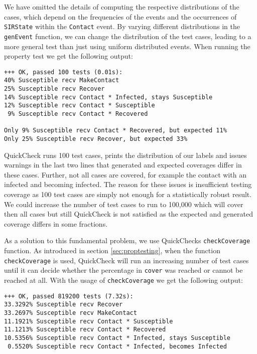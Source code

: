 We have omitted the details of computing the respective distributions of the cases, which depend on the frequencies of the events and the occurrences of \texttt{SIRState} within the \texttt{Contact} event. By varying different distributions in the \texttt{genEvent} function, we can change the distribution of the test cases, leading to a more general test than just using uniform distributed events. When running the property test we get the following output:

\begin{footnotesize}
\begin{verbatim}
+++ OK, passed 100 tests (0.01s):
40% Susceptible recv MakeContact
25% Susceptible recv Recover
14% Susceptible recv Contact * Infected, stays Susceptible
12% Susceptible recv Contact * Susceptible
 9% Susceptible recv Contact * Recovered
    
Only 9% Susceptible recv Contact * Recovered, but expected 11%
Only 25% Susceptible recv Recover, but expected 33%
\end{verbatim}
\end{footnotesize}

QuickCheck runs 100 test cases, prints the distribution of our labels and issues warnings in the last two lines that generated and expected coverages differ in these cases. Further, not all cases are covered, for example the contact with an infected and becoming infected. The reason for these issues is insufficient testing coverage as 100 test cases are simply not enough for a statistically robust result. We could increase the number of test cases to run to 100,000 which will cover then all cases but still QuickCheck is not satisfied as the expected and generated coverage differs in some fractions.

\medskip

As a solution to this fundamental problem, we use QuickChecks \texttt{checkCoverage} function. As introduced in section \ref{sec:proptesting}, when the function \texttt{checkCoverage} is used, QuickCheck will run an increasing number of test cases until it can decide whether the percentage in \texttt{cover} was reached or cannot be reached at all. With the usage of \texttt{checkCoverage} we get the following output:

\begin{footnotesize}
\begin{verbatim}
+++ OK, passed 819200 tests (7.32s):
33.3292% Susceptible recv Recover
33.2697% Susceptible recv MakeContact
11.1921% Susceptible recv Contact * Susceptible
11.1213% Susceptible recv Contact * Recovered
10.5356% Susceptible recv Contact * Infected, stays Susceptible
 0.5520% Susceptible recv Contact * Infected, becomes Infected
\end{verbatim}
\end{footnotesize}

